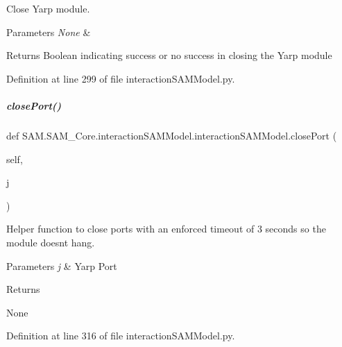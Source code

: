 Close Yarp module. 


\begin{DoxyParams}{Parameters}
{\em None} & \\
\hline
\end{DoxyParams}
\begin{DoxyReturn}{Returns}
Boolean indicating success or no success in closing the Yarp module 
\end{DoxyReturn}


Definition at line 299 of file interaction\+S\+A\+M\+Model.\+py.

\mbox{\label{group__icubclient__SAM__Core_a426a489d4b25536db51228b0049cca03}} 
\subparagraph{\texorpdfstring{close\+Port()}{closePort()}}
{\footnotesize\ttfamily def S\+A\+M.\+S\+A\+M\+\_\+\+Core.\+interaction\+S\+A\+M\+Model.\+interaction\+S\+A\+M\+Model.\+close\+Port (\begin{DoxyParamCaption}\item[{}]{self,  }\item[{}]{j }\end{DoxyParamCaption})}



Helper function to close ports with an enforced timeout of 3 seconds so the module doesn\textquotesingle{}t hang. 


\begin{DoxyParams}{Parameters}
{\em j} & Yarp Port\\
\hline
\end{DoxyParams}
\begin{DoxyReturn}{Returns}


None 
\end{DoxyReturn}


Definition at line 316 of file interaction\+S\+A\+M\+Model.\+py.

